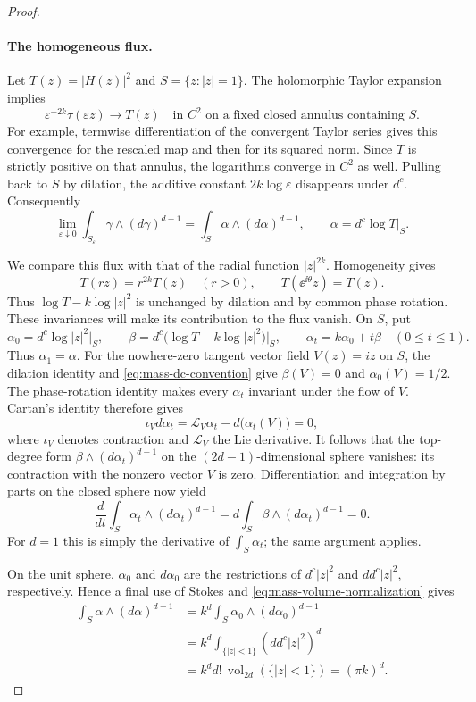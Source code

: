 \begin{proof}
\paragraph{The homogeneous flux.}
Let $T(z)=|H(z)|^2$ and $S=\{z:|z|=1\}$. The holomorphic Taylor expansion implies
\[
\varepsilon^{-2k}\tau(\varepsilon z)\longrightarrow T(z)
\quad\text{in }C^2\text{ on a fixed closed annulus containing }S.
\]
For example, termwise differentiation of the convergent Taylor series gives this convergence for the rescaled map and then for its squared norm. Since $T$ is strictly positive on that annulus, the logarithms converge in $C^2$ as well. Pulling back to $S$ by dilation, the additive constant $2k\log\varepsilon$ disappears under $d^c$. Consequently
\begin{equation}\label{eq:mass-homogeneous-limit}
\lim_{\varepsilon\downarrow0}
 \int_{S_\varepsilon}\gamma\wedge(d\gamma)^{d-1}
 =\int_S\alpha\wedge(d\alpha)^{d-1},
\qquad \alpha=d^c\log T\big|_S.
\end{equation}

We compare this flux with that of the radial function $|z|^{2k}$. Homogeneity gives
\[
T(rz)=r^{2k}T(z)\quad(r>0),\qquad T(\ee^{\ii\theta}z)=T(z).
\]
Thus $\log T-k\log|z|^2$ is unchanged by dilation and by common phase rotation. These invariances will make its contribution to the flux vanish. On $S$, put
\[
\alpha_0=d^c\log|z|^2\big|_S,
\qquad
\beta=d^c\bigl(\log T-k\log|z|^2\bigr)\big|_S,
\qquad
\alpha_t=k\alpha_0+t\beta\quad(0\leq t\leq1).
\]
Thus $\alpha_1=\alpha$. For the nowhere-zero tangent vector field $V(z)=iz$ on $S$, the dilation identity and \eqref{eq:mass-dc-convention} give $\beta(V)=0$ and $\alpha_0(V)=1/2$. The phase-rotation identity makes every $\alpha_t$ invariant under the flow of $V$. Cartan's identity therefore gives
\[
\iota_Vd\alpha_t
 =\mathcal{L}_V\alpha_t-d\bigl(\alpha_t(V)\bigr)=0,
\]
where $\iota_V$ denotes contraction and $\mathcal{L}_V$ the Lie derivative. It follows that the top-degree form $\beta\wedge(d\alpha_t)^{d-1}$ on the $(2d-1)$-dimensional sphere vanishes: its contraction with the nonzero vector $V$ is zero. Differentiation and integration by parts on the closed sphere now yield
\[
\frac{d}{dt}\int_S\alpha_t\wedge(d\alpha_t)^{d-1}
 =d\int_S\beta\wedge(d\alpha_t)^{d-1}=0.
\]
For $d=1$ this is simply the derivative of $\int_S\alpha_t$; the same argument applies.

On the unit sphere, $\alpha_0$ and $d\alpha_0$ are the restrictions of $d^c|z|^2$ and $dd^c|z|^2$, respectively. Hence a final use of Stokes and \eqref{eq:mass-volume-normalization} gives
\begin{align*}
\int_S\alpha\wedge(d\alpha)^{d-1}
 &=k^d\int_S\alpha_0\wedge(d\alpha_0)^{d-1}\\
 &=k^d\int_{\{|z|<1\}}(dd^c|z|^2)^d\\
 &=k^d d!\,\operatorname{vol}_{2d}(\{|z|<1\})
  =(\pi k)^d.
\end{align*}


\end{proof}

